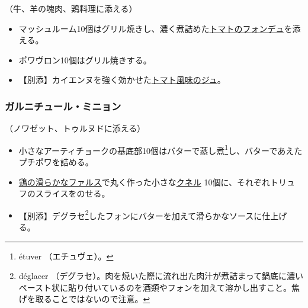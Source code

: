 \begin{recette}


（牛、羊の塊肉、鶏料理に添える）

\begin{itemize}
\item
  マッシュルーム10個はグリル焼きし、濃く煮詰めた\protect\hyperlink{portugaise}{トマトのフォンデュ}を添える。
\item
  ポワヴロン10個はグリル焼きする。
\item
  【別添】カイエンヌを強く効かせた\protect\hyperlink{jus-lie-tomate}{トマト風味のジュ}。
\end{itemize}

\atoaki{}

\hypertarget{garniture-mignon}{%
\subsubsection{ガルニチュール・ミニョン}\label{garniture-mignon}}



（ノワゼット、トゥルヌドに添える）

\begin{itemize}
\item
  小さなアーティチョークの基底部10個はバターで蒸し煮\footnote{étuver
    （エチュヴェ）。}し、バターであえたプチポワを詰める。
\item
  \protect\hyperlink{farce-b}{鶏の滑らかなファルス}で丸く作った小さな\protect\hyperlink{quenelles-diverses}{クネル}
  10個に、それぞれトリュフのスライスをのせる。
\item
  【別添】デグラセ\footnote{déglacer
    （デグラセ）。肉を焼いた際に流れ出た肉汁が煮詰まって鍋底に濃いペースト状に貼り付いているのを酒類やフォンを加えて溶かし出すこと。焦げを取ることではないので注意。}したフォンにバターを加えて滑らかなソースに仕上げる。
\end{itemize}

\atoaki{}

\hypertarget{garniture-a-la-milanaise}{%
}
\end{recette}
